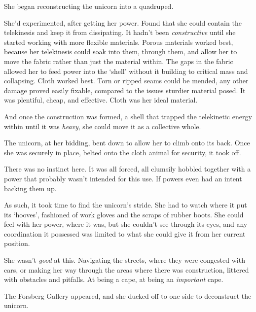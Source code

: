 She began reconstructing the unicorn into a quadruped.



She'd experimented, after getting her power.  Found that she could contain the telekinesis and keep it from dissipating.  It hadn't been \emph{constructive} until she started working with more flexible materials.  Porous materials worked best, because her telekinesis could soak into them, through them, and allow her to move the fabric rather than just the material within.  The gaps in the fabric allowed her to feed power into the `shell' without it building to critical mass and collapsing.  Cloth worked best.  Torn or ripped seams could be mended, any other damage proved easily fixable, compared to the issues sturdier material posed.  It was plentiful, cheap, and effective.  Cloth was her ideal material.



And once the construction was formed, a shell that trapped the telekinetic energy within until it was \emph{heavy}, she could move it as a collective whole.



The unicorn, at her bidding, bent down to allow her to climb onto its back.  Once she was securely in place, belted onto the cloth animal for security, it took off.



There was no instinct here.  It was all forced, all clumsily hobbled together with a power that probably wasn't intended for this use.  If powers even had an intent backing them up.



As such, it took time to find the unicorn's stride.  She had to watch where it put its `hooves', fashioned of work gloves and the scraps of rubber boots.  She could feel with her power, where it was, but she couldn't see through its eyes, and any coordination it possessed was limited to what she could give it from her current position.



She wasn't \emph{good} at this.  Navigating the streets, where they were congested with cars, or making her way through the areas where there was construction, littered with obstacles and pitfalls.  At being a cape, at being an \emph{important} cape.



The Forsberg Gallery appeared, and she ducked off to one side to deconstruct the unicorn.



